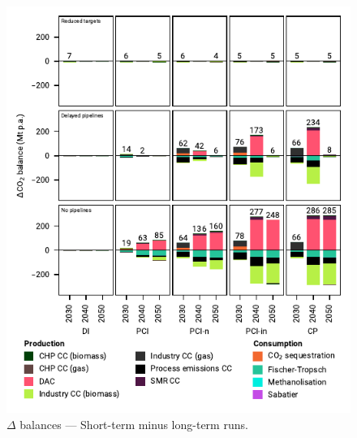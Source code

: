 \documentclass[preprint,12pt,sort&compress]{elsarticle}
\begin{document}
\begin{figure}[htbp]
  \centering
  \includegraphics[width=\linewidth]{balances_overview_extended_co2 stored}
  \caption{$\Delta$ balances --- Short-term minus long-term runs.}
  \label{fig:balances_overview_extended_co2_stored}
\end{figure}
\end{document}
